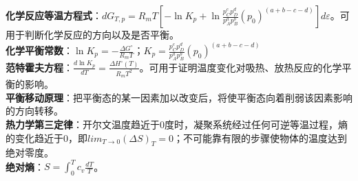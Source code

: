 \documentclass[a4paper,9pt]{ctexart}
\begin{document}
\textbf{化学反应等温方程式}：$dG_{T,p}=R_mT\left[-\ln K_p+\ln\frac{p_C^cp_D^d}{p_A^ap_B^b}(p_0)^{(a+b-c-d)}\right]d\varepsilon$。可用于判断化学反应的方向以及是否平衡。\\
\textbf{化学平衡常数}：$\ln K_p=-\frac{\Delta G^\circ}{R_mT}$；$K_p=\frac{p_C^cp_D^d}{p_A^ap_B^b}(p_0)^{(a+b-c-d)}$\\
\textbf{范特霍夫方程}：$\frac{d\ln K_p}{dT}=\frac{\Delta H^\circ(T)}{R_mT^2}$。可用于证明温度变化对吸热、放热反应的化学平衡的影响。\\
\textbf{平衡移动原理}：把平衡态的某一因素加以改变后，将使平衡态向着削弱该因素影响的方向转移。\\
\textbf{热力学第三定律}：开尔文温度趋近于0度时，凝聚系统经过任何可逆等温过程，熵的变化趋近于0，即$lim_{T\to 0}(\Delta S)_T=0$；不可能靠有限的步骤使物体的温度达到绝对零度。\\
\textbf{绝对熵}：$S=\int_0^Tc_v\frac{dT}{T}$。
\end{document}
